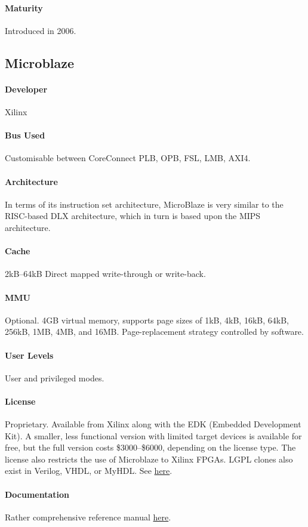 \documentclass[11pt]{article} %
\begin{document}
\paragraph{Maturity} Introduced in 2006.

\subsection{Microblaze}
\paragraph{Developer} Xilinx
\paragraph{Bus Used} Customisable between CoreConnect PLB, OPB, FSL, LMB, AXI4.
\paragraph{Architecture} In terms of its instruction set architecture, MicroBlaze is very similar to the RISC-based DLX architecture, which in turn is based upon the MIPS architecture.
\paragraph{Cache} 2kB--64kB Direct mapped write-through or write-back.
\paragraph{MMU} Optional. 4GB virtual memory, supports page sizes of 1kB, 4kB, 16kB, 64kB, 256kB, 1MB, 4MB, and 16MB. Page-replacement strategy controlled by software.
\paragraph{User Levels} User and privileged modes.
\paragraph{License} Proprietary. Available from Xilinx along with the EDK (Embedded Development Kit). A smaller, less functional version with limited target devices is available for free, but the full version costs \$3000--\$6000, depending on the license type. The license also restricts the use of Microblaze to Xilinx FPGAs. LGPL clones also exist in Verilog, VHDL, or MyHDL. See \href{http://en.wikipedia.org/wiki/MicroBlaze#Clones}{here}.
\paragraph{Documentation} Rather comprehensive reference manual \href{http://www.xilinx.com/support/documentation/sw_manuals/xilinx11/mb_ref_guide.pdf}{here}.
\end{document}
